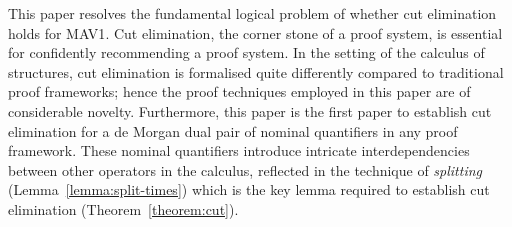 \documentclass[UKenglish,acmsmall,authorversion]{acmart}
\theoremstyle{plain}
\begin{document}
This paper resolves the fundamental logical problem of whether cut elimination holds for \textsf{MAV1}.
Cut elimination, the corner stone of a proof system, is essential for confidently recommending a proof system.
In the setting of the calculus of structures, cut elimination is formalised quite differently compared to traditional proof frameworks;
hence the proof techniques employed in this paper are of considerable novelty.
Furthermore, this paper is the first paper to establish cut elimination for a de Morgan dual pair of nominal quantifiers in any proof framework.
These nominal quantifiers introduce intricate interdependencies between other operators in the calculus, reflected in the technique of \textit{splitting} (Lemma~\ref{lemma:split-times}) which is the key lemma required to establish cut elimination (Theorem~\ref{theorem:cut}).
\end{document}
